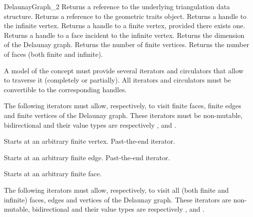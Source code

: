 \begin{ccRefConcept}{DelaunayGraph_2}
{Returns a reference to the underlying triangulation data structure.}
\ccGlue
{}
{Returns a reference to the geometric traits object.}
\ccGlue
{}
{Returns a handle to the infinite vertex.}
\ccGlue
{}
{Returns a handle to a finite vertex, provided there exists one.}
\ccGlue
{}
{Returns a handle to a face incident to the infinite vertex.}
\ccGlue
{}
{Returns the dimension of the Delaunay graph.}
\ccGlue
{}
{Returns the number of finite vertices.}
\ccGlue
{}
{Returns the number of faces (both finite and infinite).}



A model of the  concept must provide several
iterators and circulators that allow to traverse it (completely or
partially). All iterators and circulators must be convertible to the
corresponding handles.




The following iterators must allow, respectively, to visit 
finite faces,  finite edges and  finite vertices
of the Delaunay graph. These iterators must be non-mutable,
bidirectional and their value types are respectively
,  and .

{Starts at an arbitrary finite vertex.}
\ccGlue
{}
{Past-the-end iterator.}

{Starts at an arbitrary finite edge.}
\ccGlue
{}
{Past-the-end iterator.}

{Starts at an arbitrary finite face.}
\ccGlue
{}

The following iterators must allow, respectively, to visit all
(both finite and infinite) faces, edges and vertices
of the Delaunay graph. These iterators are non-mutable, bidirectional
and their value types are respectively
,  and . 


\end{ccRefConcept}
